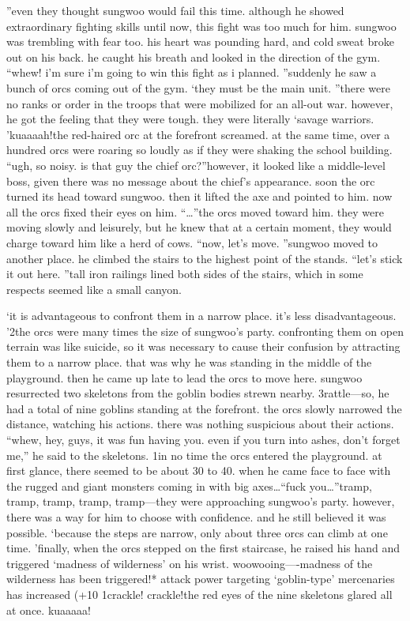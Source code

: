 ”even they thought sungwoo would fail this time.
 although he showed extraordinary fighting skills until now, this fight was too much for him.
sungwoo was trembling with fear too.
 his heart was pounding hard, and cold sweat broke out on his back.
 he caught his breath and looked in the direction of the gym.
“whew! i’m sure i’m going to win this fight as i planned.
”suddenly he saw a bunch of orcs coming out of the gym.
‘they must be the main unit.
”there were no ranks or order in the troops that were mobilized for an all-out war.
 however, he got the feeling that they were tough.
 they were literally ‘savage warriors.
’kuaaaah!the red-haired orc at the forefront screamed.
 at the same time, over a hundred orcs were roaring so loudly as if they were shaking the school building.
“ugh, so noisy.
 is that guy the chief orc?”however, it looked like a middle-level boss, given there was no message about the chief’s appearance.
soon the orc turned its head toward sungwoo.
 then it lifted the axe and pointed to him.
 now all the orcs fixed their eyes on him.
“…”the orcs moved toward him.
 they were moving slowly and leisurely, but he knew that at a certain moment, they would charge toward him like a herd of cows.
“now, let’s move.
”sungwoo moved to another place.
 he climbed the stairs to the highest point of the stands.
“let’s stick it out here.
”tall iron railings lined both sides of the stairs, which in some respects seemed like a small canyon.


‘it is advantageous to confront them in a narrow place.
 it’s less disadvantageous.
’2the orcs were many times the size of sungwoo’s party.
 confronting them on open terrain was like suicide, so it was necessary to cause their confusion by attracting them to a narrow place.
 that was why he was standing in the middle of the playground.
 then he came up late to lead the orcs to move here.
sungwoo resurrected two skeletons from the goblin bodies strewn nearby.
3rattle—so, he had a total of nine goblins standing at the forefront.
 the orcs slowly narrowed the distance, watching his actions.
 there was nothing suspicious about their actions.
“whew, hey, guys, it was fun having you.
 even if you turn into ashes, don’t forget me,” he said to the skeletons.
1in no time the orcs entered the playground.
 at first glance, there seemed to be about 30 to 40.
when he came face to face with the rugged and giant monsters coming in with big axes…“fuck you…”tramp, tramp, tramp, tramp, tramp—they were approaching sungwoo’s party.
however, there was a way for him to choose with confidence.
 and he still believed it was possible.
‘because the steps are narrow, only about three orcs can climb at one time.
’finally, when the orcs stepped on the first staircase, he raised his hand and triggered ‘madness of wilderness’ on his wrist.
woowooing—-madness of the wilderness has been triggered!* attack power targeting ‘goblin-type’ mercenaries has increased (+10%
1crackle! crackle!the red eyes of the nine skeletons glared all at once.
kuaaaaa!

 
